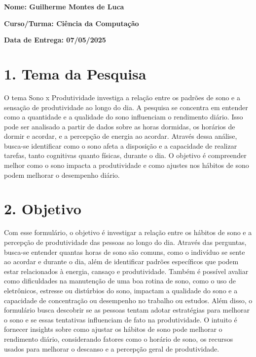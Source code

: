 \documentclass[12pt,a4paper]{article}
\begin{document}
\hfill
\vspace{1cm}

\textbf{Nome: Guilherme Montes de Luca} 

\textbf{Curso/Turma: Ciência da Computação} 

\textbf{Data de Entrega: 07/05/2025}

\vspace{1cm}

\section*{1. Tema da Pesquisa}
O tema Sono x Produtividade investiga a relação entre os padrões de sono e a sensação de produtividade ao longo do dia. A pesquisa se concentra em entender como a quantidade e a qualidade do sono influenciam o rendimento diário. Isso pode ser analisado a partir de dados sobre as horas dormidas, os horários de dormir e acordar, e a percepção de energia ao acordar. Através dessa análise, busca-se identificar como o sono afeta a disposição e a capacidade de realizar tarefas, tanto cognitivas quanto físicas, durante o dia. O objetivo é compreender melhor como o sono impacta a produtividade e como ajustes nos hábitos de sono podem melhorar o desempenho diário.

\section*{2. Objetivo}
Com esse formulário, o objetivo é investigar a relação entre os hábitos de sono e a percepção de produtividade das pessoas ao longo do dia. Através das perguntas, busca-se entender quantas horas de sono são comuns, como o indivíduo se sente ao acordar e durante o dia, além de identificar padrões específicos que podem estar relacionados à energia, cansaço e produtividade. Também é possível avaliar como dificuldades na manutenção de uma boa rotina de sono, como o uso de eletrônicos, estresse ou distúrbios do sono, impactam a qualidade do sono e a capacidade de concentração ou desempenho no trabalho ou estudos. Além disso, o formulário busca descobrir se as pessoas tentam adotar estratégias para melhorar o sono e se essas tentativas influenciam de fato na produtividade. O intuito é fornecer insights sobre como ajustar os hábitos de sono pode melhorar o rendimento diário, considerando fatores como o horário de sono, os recursos usados para melhorar o descanso e a percepção geral de produtividade.
\end{document}
